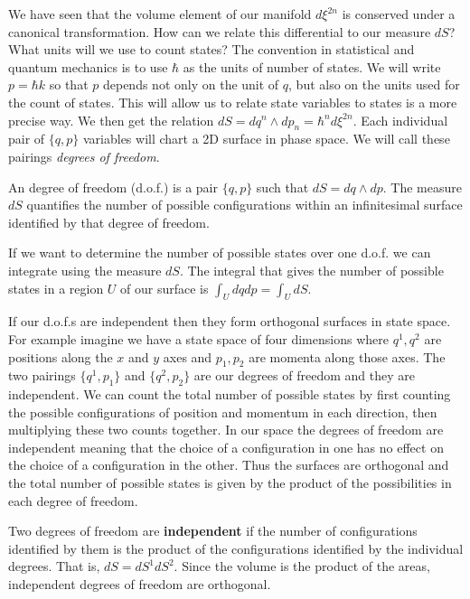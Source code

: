 \documentclass{article}
\begin{document}
	We have seen that the volume element of our manifold $d \xi^{2n}$ is conserved under a canonical transformation. How can we relate this differential to our measure $dS$? What units will we use to count states? The convention in statistical and quantum mechanics is to use $\hbar$ as the units of number of states. We will write $p = \hbar k$ so that $p$ depends not only on the unit of $q$, but also on the units used for the count of states. This will allow us to relate state variables to states is a more precise way. We then get the relation $dS = dq^n \land dp_n = \hbar^n d\xi^{2n}$. Each individual pair of $\{q,p\}$  variables will chart a 2D surface in phase space. We will call these pairings \textit{degrees of freedom}.

\begin{defn}
	An degree of freedom (d.o.f.) is a pair $\{q,p \}$ such that $dS = dq \land dp$. The measure $dS$ quantifies the number of possible configurations within an infinitesimal surface identified by that degree of freedom.
\end{defn}

	If we want to determine the number of possible states over one d.o.f. we can integrate using the measure $dS$. The integral that gives the number of possible states in a region $U$ of our surface is $\int_{U} dq dp = \int_{U} dS$.

	If our d.o.f.s are independent then they form orthogonal surfaces in state space. For example imagine we have a state space of four dimensions where $q^1,q^2$ are positions along the $x$ and $y$ axes and $p_1,p_2$ are momenta along those axes. The two pairings $\{q^1,p_1 \}$ and $\{q^2,p_2 \}$ are our degrees of freedom and they are independent. We can count the total number of possible states by first counting the possible configurations of position and momentum in each direction, then multiplying these two counts together. In our space the degrees of freedom are independent meaning that the choice of a configuration in one has no effect on the choice of a configuration in the other. Thus the surfaces are orthogonal and the total number of possible states is given by the product of the possibilities in each degree of freedom.



\begin{defn}
	Two degrees of freedom are \textbf{independent} if the number of configurations identified by them is the product of the configurations identified by the individual degrees. That is, $dS = dS^1 dS^2$. Since the volume is the product of the areas, independent degrees of freedom are orthogonal.
\end{defn}
\end{document}

